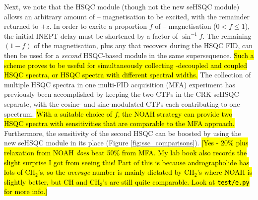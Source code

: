 \documentclass[11pt]{article}
\newcommand*{\carbon}{\ce{^{13}C}}
\newcommand*{\proton}{\ce{^{1}H}}
\newcommand*{\figref}[1]{Figure \ref{fig:#1}}
\begin{document}
Next, we note that the HSQC module (though not the new seHSQC module) allows an arbitrary amount of \carbon{}--\proton{} magnetisation to be excited, with the remainder returned to $+z$.  In order to excite a proportion $f$ of \carbon{}--\proton{} magnetisation ($0 < f \leq 1$), the initial INEPT delay must be shortened by a factor of $\sin^{-1}f$.
The remaining $(1 - f)$ of the magnetisation, plus any that recovers during the HSQC FID, can then be used for a \textit{second} HSQC-based module in the same supersequence.
\hl{Such a scheme proves to be useful for simultaneously collecting \carbon{}-decoupled and coupled HSQC spectra, or HSQC spectra with different spectral widths.}
The collection of multiple \carbon{} HSQC spectra in one multi-FID acquisition (MFA) experiment has previously been accomplished by keeping the two CTPs in the CRK seHSQC separate, with the cosine- and sine-modulated CTPs each contributing to one spectrum.\autocite{ctphsqc}
\hl{With a suitable choice of $f$, the NOAH strategy can provide two HSQC spectra with sensitivities that are comparable to the MFA approach.}
Furthermore, the sensitivity of the second HSQC can be boosted by using the new seHSQC module in its place (\figref{ssc_comparisons}).
\hl{[Yes - 20\% plus relaxation from NOAH \textit{does} beat 50\% from MFA. My lab book also records the slight surprise I got from seeing this! Part of this is because andrographolide has lots of CH$_2$'s, so the \textit{average} number is mainly dictated by CH$_2$'s where NOAH is slightly better, but CH and CH$_3$'s are still quite comparable. Look at \texttt{test/e.py} for more info.]}
\end{document}
